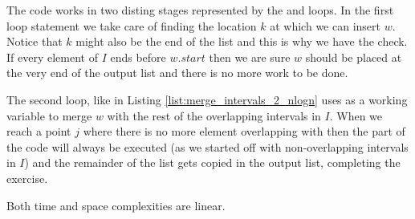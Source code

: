 The code works in two disting stages represented by the  and  loops. 
In the first loop statement we take care of finding the location $k$ at which we can insert $w$. 
Notice that $k$ might also be the end of the list and this is why we have the  check. If every element of $I$ ends before $w.start$ then we are sure $w$ should be placed at the very end of the output list and there is no more work to be done. 

The second loop, like in Listing \ref{list:merge_intervals_2_nlogn} uses  as a working variable to merge $w$ with the rest of the overlapping intervals in $I$. 
When we reach a point $j$ where there is no more element overlapping with  then the  part of the code will always be executed (as we started off with non-overlapping intervals in $I$) and the remainder of the list gets copied in the output list, completing the exercise.

Both time and space complexities are linear.
